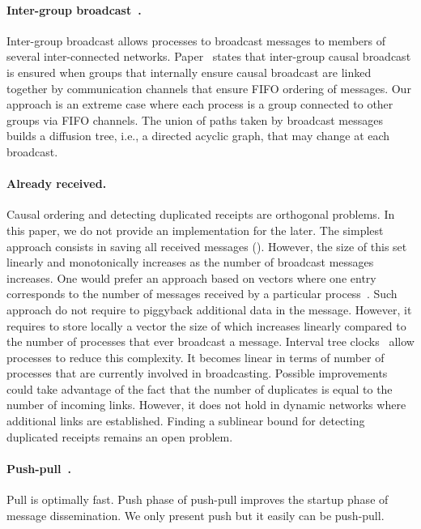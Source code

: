 \paragraph{Inter-group
  broadcast~\cite{johnson1998scalable,johnson1999intergroup}.} Inter-group
broadcast allows processes to broadcast messages to members of several
inter-connected networks. Paper~\cite{johnson1999intergroup} states that
inter-group causal broadcast is ensured when groups that internally ensure
causal broadcast are linked together by communication channels that ensure FIFO
ordering of messages. Our approach is an extreme case where each process is a
group connected to other groups via FIFO channels. The union of paths taken by
broadcast messages builds a diffusion tree, i.e., a directed acyclic graph, that may
change at each broadcast.

\paragraph{Already received.} Causal ordering and detecting duplicated receipts
are orthogonal problems. In this paper, we do not provide an implementation for
the later. The simplest approach consists in saving all received messages
(\REF). However, the size of this set linearly and monotonically increases as
the number of broadcast messages increases. One would prefer an approach based
on vectors where one entry corresponds to the number of messages received by a
particular process~\cite{fidge1988timestamps}. Such approach do not require to
piggyback additional data in the message. However, it requires to store locally
a vector the size of which increases linearly compared to the number of
processes that ever broadcast a message. Interval tree
clocks~\cite{almeida2008interval} allow processes to reduce this complexity. It
becomes linear in terms of number of processes that are currently involved in
broadcasting. Possible improvements could take advantage of the fact that the
number of duplicates is equal to the number of incoming links. However, it does
not hold in dynamic networks where additional links are established. Finding a
sublinear bound for detecting duplicated receipts remains an open problem.

\paragraph{Push-pull~\cite{mercier2017optimal}.} Pull is optimally fast. Push
phase of push-pull improves the startup phase of message dissemination. We only
present push but it easily can be push-pull.


